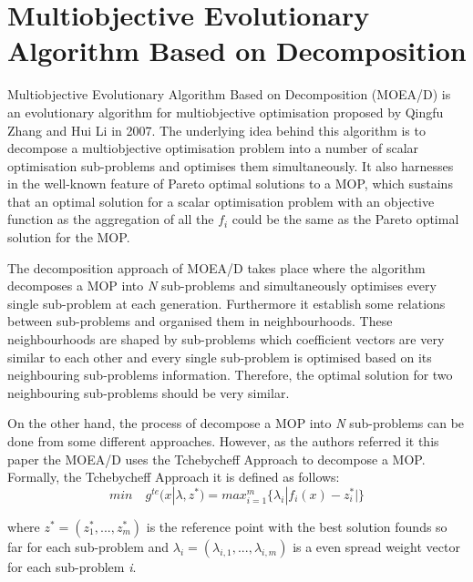\section{Multiobjective Evolutionary Algorithm Based on Decomposition}
Multiobjective Evolutionary Algorithm Based on Decomposition (MOEA/D) is an evolutionary algorithm for multiobjective optimisation proposed by Qingfu Zhang and Hui Li in 2007\cite{Zhang2007}. The underlying idea behind this algorithm is to decompose a multiobjective optimisation problem into a number of scalar optimisation sub-problems and optimises them simultaneously. It also harnesses in the well-known feature of Pareto optimal solutions to a MOP, which sustains that an optimal solution for a scalar optimisation problem with an objective function as the aggregation of all the $f_{i}$ could be the same as the Pareto optimal solution for the MOP\cite{Zhang2007}.

The decomposition approach of MOEA/D takes place where the algorithm decomposes a MOP into \textit{N} sub-problems and simultaneously optimises every single sub-problem at each generation. Furthermore it establish some relations between sub-problems and organised them in neighbourhoods. These neighbourhoods are shaped by sub-problems which coefficient vectors are very similar to each other and every single sub-problem is optimised based on its neighbouring sub-problems information. Therefore, the optimal solution for two neighbouring sub-problems should be very similar\cite{Zhang2007}.

On the other hand, the process of decompose a MOP into \textit{N} sub-problems can be done from some different approaches. However, as the authors referred\cite{Zhang2007} it this paper the MOEA/D uses the Tchebycheff Approach\cite{Ma2018} to decompose a MOP. Formally, the Tchebycheff Approach it is defined as follows:
\[
min\quad g^{te}(x|\lambda,z^{*}) = max_{i=1}^{m}\{\lambda_{i}|f_{i}(x)-z_{i}^{*}|\}
\]

where $z^{*} = (z^{*}_{1}, ..., z^{*}_{m})$ is the reference point with the best solution founds so far for each sub-problem and $\lambda_{i} = (\lambda_{i,1}, ..., \lambda_{i,m})$ is a even spread weight vector for each sub-problem \textit{i}.

